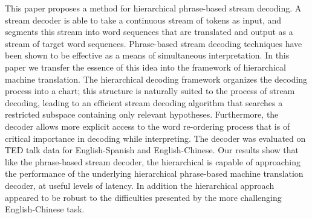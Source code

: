 This paper proposes a method for hierarchical phrase-based stream decoding. A stream decoder is able to take a continuous stream of tokens as input, and segments this stream into word sequences that are translated and output as a stream of target word sequences. Phrase-based stream decoding techniques have been shown to be effective as a means of simultaneous interpretation. In this paper we transfer the essence of this idea into the framework of hierarchical machine translation. The hierarchical decoding framework organizes the decoding process into a chart; this structure is naturally suited to the process of stream decoding, leading to an efficient stream decoding algorithm that searches a restricted subspace containing only relevant hypotheses. Furthermore, the decoder allows more explicit access to the word re-ordering process that is of critical importance in decoding while interpreting. The decoder was evaluated on TED talk data for English-Spanish and English-Chinese. Our results show that like the phrase-based stream decoder, the hierarchical is capable of approaching the performance of the underlying hierarchical phrase-based machine translation decoder, at useful levels of latency. In addition the hierarchical approach appeared to be robust to the difficulties presented by the more challenging English-Chinese task.
